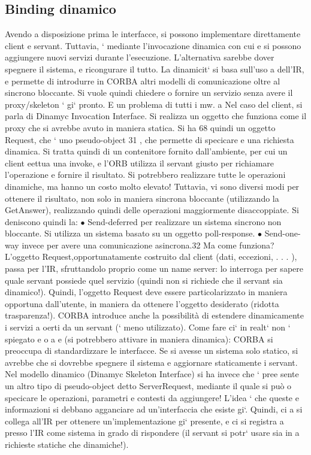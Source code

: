 \documentclass[a4paper,12pt]{article}
\begin{document}
\subsection{Binding dinamico}
Avendo a disposizione prima le interfacce, si possono implementare direttamente client e servant. Tuttavia, ` mediante
l'invocazione dinamica con cui
e
si possono aggiungere nuovi servizi durante l'esecuzione. L'alternativa sarebbe
dover spegnere il sistema, e ricongurare il tutto. La dinamicit` si basa sull'uso
a
dell'IR, e permette di introdurre in CORBA altri modelli di comunicazione oltre
al sincrono bloccante.
Si vuole quindi chiedere o fornire un servizio senza avere il proxy/skeleton
`
gi` pronto. E un problema di tutti i mw.
a
Nel caso del client, si parla di Dinamyc Invocation Interface. Si realizza un
oggetto che funziona come il proxy che si avrebbe avuto in maniera statica. Si ha
68
quindi un oggetto Request, che ` uno pseudo-object 31 , che permette di specicare
e
una richiesta dinamica. Si tratta quindi di un contenitore fornito dall'ambiente,
per cui un client eettua una invoke, e l'ORB utilizza il servant giusto per
richiamare l'operazione e fornire il risultato. Si potrebbero realizzare tutte le
operazioni dinamiche, ma hanno un costo molto elevato! Tuttavia, vi sono
diversi modi per ottenere il risultato, non solo in maniera sincrona bloccante
(utilizzando la GetAnswer), realizzando quindi delle operazioni maggiormente
disaccoppiate. Si deniscono quindi la:
$\bullet$ Send-deferred per realizzare un sistema sincrono non bloccante. Si utilizza
un sistema basato su un oggetto poll-response.
$\bullet$ Send-one-way invece per avere una comunicazione asincrona.32
Ma come funziona? L'oggetto Request,opportunatamente costruito dal client
(dati, eccezioni, . . . ), passa per l'IR, sfruttandolo proprio come un name server: lo interroga per sapere quale
servant possiede quel servizio (quindi non si
richiede che il servant sia dinamico!). Quindi, l'oggetto Request deve essere particolarizzato in maniera opportuna
dall'utente, in maniera da ottenere l'oggetto
desiderato (ridotta trasparenza!).
CORBA introduce anche la possibilità di estendere dinamicamente i servizi
a
oerti da un servant (` meno utilizzato). Come fare ci` in realt` non ` spiegato
e
o
a
e
(si potrebbero attivare in maniera dinamica): CORBA si preoccupa di standardizzare le interfacce. Se si avesse un
sistema solo statico, si avrebbe che si
dovrebbe spegnere il sistema e aggiornare staticamente i servant.
Nel modello dinamico (Dinamyc Skeleton Interface) si ha invece che ` pree
sente un altro tipo di pseudo-object detto ServerRequest, mediante il quale si può
o
specicare le operazioni, parametri e contesti da aggiungere! L'idea ` che queste
e
informazioni si debbano agganciare ad un'interfaccia che esiste gi`. Quindi, ci
a
si collega all'IR per ottenere un'implementazione gi` presente, e ci si registra
a
presso l'IR come sistema in grado di rispondere (il servant si potr` usare sia in
a
richieste statiche che dinamiche!).
\end{document}
